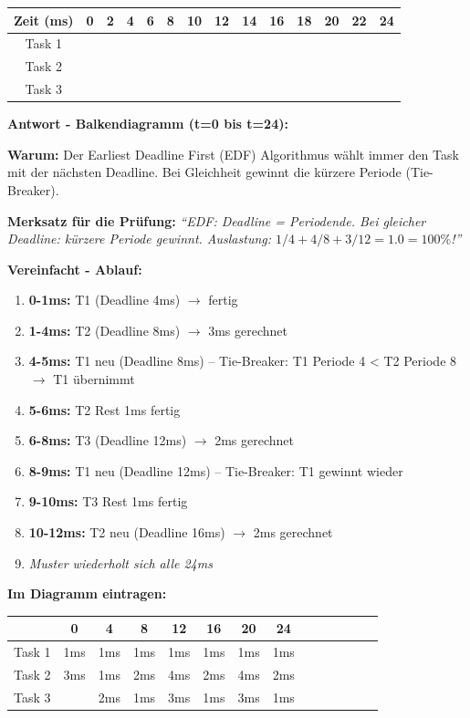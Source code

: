 \documentclass[a4paper,11pt]{article}
\begin{document}
\begin{tcolorbox}[colback=blue!4!white,colframe=blue!55!black,title=Skizzenraster]
\begin{tabular}{|c|c|c|c|c|c|c|c|c|c|c|c|c|c|}
\hline
Zeit (ms) & 0 & 2 & 4 & 6 & 8 & 10 & 12 & 14 & 16 & 18 & 20 & 22 & 24 \\
\hline
Task 1 & & & & & & & & & & & & & \\
\hline
Task 2 & & & & & & & & & & & & & \\
\hline
Task 3 & & & & & & & & & & & & & \\
\hline
\end{tabular}
\end{tcolorbox}

\begin{tcolorbox}[colback=green!15!white,colframe=green!70!black,title=\textbf{Lösung Aufgabe 5}]
\textbf{Antwort - Balkendiagramm (t=0 bis t=24):}

\textbf{Warum:} Der Earliest Deadline First (EDF) Algorithmus wählt immer den Task mit der nächsten Deadline. Bei Gleichheit gewinnt die kürzere Periode (Tie-Breaker).

\textbf{Merksatz für die Prüfung:} \textit{``EDF: Deadline = Periodende. Bei gleicher Deadline: kürzere Periode gewinnt. Auslastung: $1/4 + 4/8 + 3/12 = 1.0 = 100\%$!''}

\textbf{Vereinfacht - Ablauf:}
\begin{enumerate}[leftmargin=*]
  \item \textbf{0-1ms:} T1 (Deadline 4ms) $\rightarrow$ fertig
  \item \textbf{1-4ms:} T2 (Deadline 8ms) $\rightarrow$ 3ms gerechnet
  \item \textbf{4-5ms:} T1 neu (Deadline 8ms) -- Tie-Breaker: T1 Periode 4 < T2 Periode 8 $\rightarrow$ T1 übernimmt
  \item \textbf{5-6ms:} T2 Rest 1ms fertig
  \item \textbf{6-8ms:} T3 (Deadline 12ms) $\rightarrow$ 2ms gerechnet
  \item \textbf{8-9ms:} T1 neu (Deadline 12ms) -- Tie-Breaker: T1 gewinnt wieder
  \item \textbf{9-10ms:} T3 Rest 1ms fertig
  \item \textbf{10-12ms:} T2 neu (Deadline 16ms) $\rightarrow$ 2ms gerechnet
  \item \textit{Muster wiederholt sich alle 24ms}
\end{enumerate}

\textbf{Im Diagramm eintragen:}
\begin{center}
\begin{tabular}{|c|ccccccccccccc|}
\hline
& 0 & 4 & 8 & 12 & 16 & 20 & 24 \\
\hline
Task 1 & 1ms & 1ms & 1ms & 1ms & 1ms & 1ms & 1ms \\
Task 2 & 3ms & 1ms & 2ms & 4ms & 2ms & 4ms & 2ms \\
Task 3 & & 2ms & 1ms & 3ms & 1ms & 3ms & 1ms \\
\hline
\end{tabular}
\end{center}
\end{tcolorbox}
\end{document}
